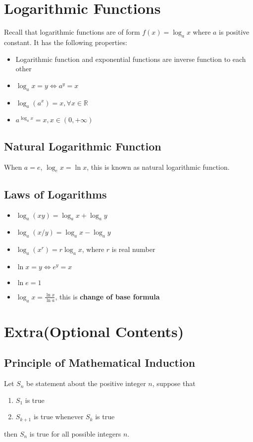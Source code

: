 \documentclass[10pt,a4paper,oneside]{article}
\begin{document}
\section{Logarithmic Functions}
Recall that logarithmic functions are of form $f(x) = \log _a x$ where $a$ is positive constant. It has the following properties:
\begin{itemize}
	\item Logarithmic function and exponential functions are inverse function to each other
	\item $\log_a x = y \Leftrightarrow a^y = x$
	\item $\log_a (a^x) = x, \forall x \in \mathbb{R}$
	\item $a^{\log_a x} = x, x \in (0, +\infty)$
\end{itemize}

\subsection{Natural Logarithmic Function}
When $a=e$, $\log_e x = \ln x$, this is known as natural logarithmic function.

\subsection{Laws of Logarithms}
\begin{itemize}
	\item $\log_a (xy) = \log_a x + \log_a y$
	\item $\log_a (x/y) = \log_a x - \log_a y$
	\item $\log_a (x^r) = r \log_a x$, where $r$ is real number
	\item $\ln x = y \Leftrightarrow e^y = x$
	\item $\ln e = 1$
	\item $\log_a x = \frac{\ln x}{\ln a}$, this is \textbf{change of base formula}
	
\end{itemize}

\section{Extra(Optional Contents)}
\subsection{Principle of Mathematical Induction}
Let $S_n$ be statement about the positive integer $n$, suppose that
\begin{enumerate}
	\item $S_1$ is true
	\item $S_{k+1}$ is true whenever $S_k$ is true
\end{enumerate}
then $S_n$ is true for all possible integers $n$.
\end{document}
